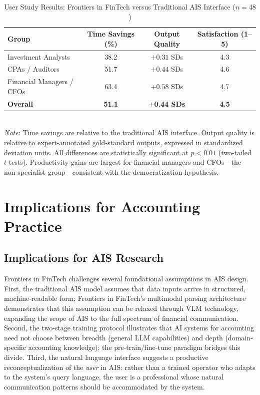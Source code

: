 \documentclass[12pt,letterpaper]{article}
\begin{document}
\begin{table}[htbp]
  \singlespacing
  \centering
  \caption{User Study Results: Frontiers in FinTech versus Traditional AIS
    Interface ($n = 48$)}
  \label{tab:userstudy}
  \begin{tabular}{@{}lccc@{}}
    \toprule
    \textbf{Group} & \textbf{Time Savings (\%)} & \textbf{Output Quality}
      & \textbf{Satisfaction (1--5)} \\
    \midrule
    Investment Analysts       & 38.2 & $+0.31$ SDs & 4.3 \\
    CPAs / Auditors           & 51.7 & $+0.44$ SDs & 4.6 \\
    Financial Managers / CFOs & 63.4 & $+0.58$ SDs & 4.7 \\
    \midrule
    \textbf{Overall}          & \textbf{51.1}
      & $+$\textbf{0.44 SDs} & \textbf{4.5} \\
    \bottomrule
  \end{tabular}
  \vspace{4pt}\\
  \footnotesize\textit{Note}: Time savings are relative to the traditional AIS
  interface. Output quality is relative to expert-annotated gold-standard
  outputs, expressed in standardized deviation units. All differences are
  statistically significant at $p < 0.01$ (two-tailed $t$-tests).
  Productivity gains are largest for financial managers and CFOs---the
  non-specialist group---consistent with the democratization hypothesis.
\end{table}

\section{Implications for Accounting Practice}
\label{sec:implications}

\subsection{Implications for AIS Research}

Frontiers in FinTech challenges several foundational assumptions in AIS design.
First, the traditional AIS model assumes that data inputs arrive in
structured, machine-readable form; Frontiers in FinTech's multimodal parsing
architecture demonstrates that this assumption can be relaxed through
VLM technology, expanding the scope of AIS to the full spectrum of
financial communication.
Second, the two-stage training protocol illustrates that AI systems
for accounting need not choose between breadth (general LLM
capabilities) and depth (domain-specific accounting knowledge); the
pre-train/fine-tune paradigm bridges this divide.
Third, the natural language interface suggests a productive
reconceptualization of the \emph{user} in AIS: rather than a trained
operator who adapts to the system's query language, the user is a
professional whose natural communication patterns should be
accommodated by the system.
\end{document}
